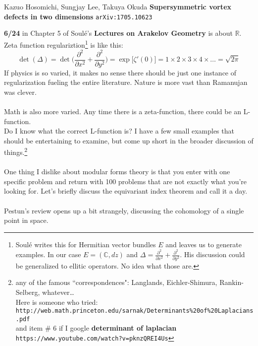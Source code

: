 \documentclass[12pt]{article}
\begin{document}
\vfill

\begin{thebibliography}{}

\item Kazuo Hosomichi, Sungjay Lee, Takuya Okuda \textbf{Supersymmetric vortex defects in two dimensions} \texttt{arXiv:1705.10623}

\end{thebibliography}

\newpage

\noindent \textbf{6/24} in Chapter 5 of Soul\'{e}'s \textbf{Lectures on Arakelov Geometry} is about $\mathbb{R}$. Zeta function regulariztion\footnote{Soul\'{e} writes this for Hermitian vector bundles $E$ and leaves us to generate examples.  In our case $E = (\mathbb{C}, dz)$ and $\Delta = \frac{\partial^2}{\partial x^2} + \frac{\partial^2}{\partial y^2} $. His discussion could be generalized to ellitic operators.  No idea what those are.} is like this:
$$\det (\Delta) = \det \Big( \frac{\partial^2}{\partial x^2} + \frac{\partial^2}{\partial y^2}\Big) = \exp \big[ \zeta'(0) \big] = 1 \times 2 \times 3 \times 4 \times \dots = \sqrt{2\pi}  $$
If physics is so varied, it makes no sense there should be just one instance of regularization fueling the entire literature.  Nature is more vast than Ramanujan was clever. \\ \\
Math is also more varied.  Any time there is a zeta-function, there could be an L-function. \\ Do I know what the correct L-function is?  I have a few small examples that should be entertaining to examine, but come up short in the broader discussion of things.\footnote{any of the famous ``correspondences": Langlands, Eichler-Shimura, Rankin-Selberg, whatever\dots \\ Here is someone who tried: \texttt{http://web.math.princeton.edu/sarnak/Determinants\%20of\%20Laplacians.pdf} \\ 
and item \# 6 if I google \textbf{determinant of laplacian} \texttt{https://www.youtube.com/watch?v=pknzQREI4Us} }  \\ \\
One thing I dislike about modular forms theory is that you enter with one specific problem and return with 100 problems that are not exactly what you're looking for.  Let's briefly discuss the equivariant index theorem and call it a day. \\ \\
Pestun's review opens up a bit strangely, discussing the cohomology of a single point in space.
\end{document}
